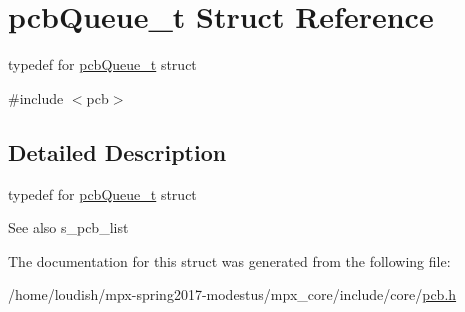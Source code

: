 \hypertarget{structpcb_queue__t}{}\section{pcb\+Queue\+\_\+t Struct Reference}
\label{structpcb_queue__t}


typedef for \hyperlink{structpcb_queue__t}{pcb\+Queue\+\_\+t} struct  




{\ttfamily \#include $<$pcb$>$}



\subsection{Detailed Description}
typedef for \hyperlink{structpcb_queue__t}{pcb\+Queue\+\_\+t} struct 

\begin{DoxySeeAlso}{See also}
s\+\_\+pcb\+\_\+list 
\end{DoxySeeAlso}


The documentation for this struct was generated from the following file\+:\begin{DoxyCompactItemize}
\item 
/home/loudish/mpx-\/spring2017-\/modestus/mpx\+\_\+core/include/core/\hyperlink{pcb_8h}{pcb.\+h}\end{DoxyCompactItemize}
